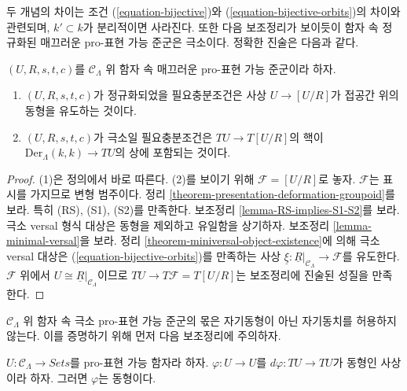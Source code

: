 \noindent
두 개념의 차이는 조건 (\ref{equation-bijective})와
(\ref{equation-bijective-orbits})의 차이와 관련되며,
$k' \subset k$가 분리적이면 사라진다. 또한 다음 보조정리가 보이듯이
함자 속 정규화된 매끄러운 pro-표현 가능 준군은 극소이다.
정확한 진술은 다음과 같다.

\begin{lemma}
\label{lemma-characterize-minimal-groupoid-in-functors}
$(U, R, s, t, c)$를 $\mathcal{C}_\Lambda$ 위 함자 속
매끄러운 pro-표현 가능 준군이라 하자.
\begin{enumerate}
\item $(U, R, s, t, c)$가 정규화되었을 필요충분조건은 사상
$U \to [U/R]$가 접공간 위의 동형을 유도하는 것이다.
\item $(U, R, s, t, c)$가 극소일 필요충분조건은
$TU \to T[U/R]$의 핵이
$\text{Der}_\Lambda(k, k) \to TU$의 상에 포함되는 것이다.
\end{enumerate}
\end{lemma}

\begin{proof}
(1)은 정의에서 바로 따른다. (2)를 보이기 위해
$\mathcal{F} = [U/R]$로 놓자. $\mathcal{F}$는 표시를 가지므로
변형 범주이다. 정리 \ref{theorem-presentation-deformation-groupoid}를 보라.
특히 (RS), (S1), (S2)를 만족한다. 보조정리
\ref{lemma-RS-implies-S1-S2}를 보라.
극소 versal 형식 대상은 동형을 제외하고 유일함을 상기하자.
보조정리 \ref{lemma-minimal-versal}을 보라. 정리
\ref{theorem-miniversal-object-existence}에 의해 극소 versal 대상은
(\ref{equation-bijective-orbits})를 만족하는 사상
$\underline{\xi} : \underline{R}|_{\mathcal{C}_\Lambda} \to \mathcal{F}$를
유도한다.
$\mathcal{F}$ 위에서 $U \cong \underline{R}|_{\mathcal{C}_\Lambda}$이므로
$TU \to T\mathcal{F} = T[U/R]$는 보조정리에 진술된 성질을 만족한다.
\end{proof}

\noindent
$\mathcal C_\Lambda$ 위 함자 속 극소 pro-표현 가능 준군의 몫은
자기동형이 아닌 자기동치를 허용하지 않는다. 이를 증명하기 위해
먼저 다음 보조정리에 주의하자.

\begin{lemma}
\label{lemma-surjective-morphism-prorepresentable-functor}
$U: \mathcal{C}_\Lambda \to \textit{Sets}$를 pro-표현 가능 함자라 하자.
$\varphi : U \to U$를 $d\varphi : TU \to TU$가 동형인 사상이라 하자.
그러면 $\varphi$는 동형이다.
\end{lemma}

